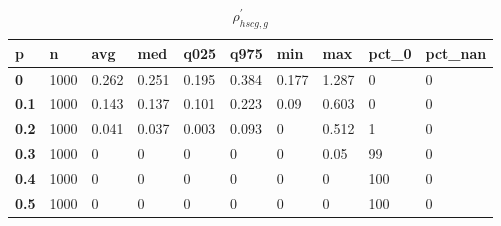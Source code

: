 \begin{table}[h]
 \centering 
\footnotesize
\caption{$\rho_{hscg,g}^\prime $}
\label{tab:alphahscgg}
\begin{tabular}[h]{|l|l|l|l|l|l|l|l|l|l|
    } \hline
\textbf{ p} & \textbf{ n} & \textbf{ avg} & \textbf{ med} & \textbf{ q025} & \textbf{ q975} & \textbf{ min} & \textbf{ max} & \textbf{ pct\_0} & \textbf{ pct\_nan}
    \\ \hline
  \textbf{  0} & 1000 & 0.262 & 0.251 & 0.195 & 0.384 & 0.177 & 1.287 &   0 & 0
    \\ \hline
  \textbf{0.1} & 1000 & 0.143 & 0.137 & 0.101 & 0.223 &  0.09 & 0.603 &   0 & 0
    \\ \hline
  \textbf{0.2} & 1000 & 0.041 & 0.037 & 0.003 & 0.093 &     0 & 0.512 &   1 & 0
    \\ \hline
  \textbf{0.3} & 1000 &     0 &     0 &     0 &     0 &     0 &  0.05 &  99 & 0
    \\ \hline
  \textbf{0.4} & 1000 &     0 &     0 &     0 &     0 &     0 &     0 & 100 & 0
    \\ \hline
  \textbf{0.5} & 1000 &     0 &     0 &     0 &     0 &     0 &     0 & 100 & 0
    \\ \hline
 \end{tabular}
 \end{table}

